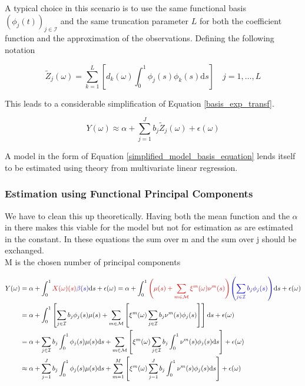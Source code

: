 \documentclass[11pt,twoside,a4paper]{article}
\begin{document}
	A typical choice in this scenario is to use the same functional basis $\left(\phi_j(t)\right)_{j \in \mathcal{I}}$ and the same truncation parameter $L$ for both the coefficient function and the approximation of the observations. Defining the following notation 

	\begin{equation}
			\tilde{Z}_j(\omega) = \sum_{k = 1}^{L} \left[d_k(\omega) \int_{0}^{1} \phi_j(s) \phi_k(s) \mathrm{d}s \right] \quad j = 1, \dots, L
	\end{equation}

	This leads to a considerable simplification of Equation \ref{basis_exp_transf}.
	
	\begin{equation}\label{simplified_model_basis_equation}
		Y(\omega) \approx \alpha + \sum_{j = 1}^{J} b_j \tilde{Z}_j(\omega) + \epsilon(\omega)
	\end{equation}

	A model in the form of Equation \ref{simplified_model_basis_equation} lends itself to be estimated using theory from multivariate linear regression.
	
	\subsubsection{Estimation using Functional Principal Components}

	{\color{red} We have to clean this up theoretically. Having both the mean function and the $\alpha$ in there makes this viable for the model but not for estimation as are estimated in the constant. In these equations the sum over m and the sum over j should be exchanged.\\
	M is the chosen number of principal components}

	\begin{equation}
		\begin{split}
			Y(\omega) &= \alpha + \int_{0}^{1} {\color{red}X(\omega)(s)} {\color{blue}\beta(s)} \mathrm{d}s + \epsilon(\omega)
			= \alpha + \int_{0}^{1} {\color{red}\left(\mu(s) + \sum_{m \in \mathcal{M}} \xi^m(\omega) \nu^m(s)\right)} {\color{blue}\left(\sum_{j \in \mathcal{I}} b_j \phi_j(s)\right)} \mathrm{d}s + \epsilon(\omega)\\
			&= \alpha + \int_{0}^{1} \left[ \sum_{j \in \mathcal{I}} b_j \phi_j(s) \mu(s) + \sum_{m \in \mathcal{M}} \left[ \xi^m(\omega) \sum_{j \in \mathcal{I}} b_j \nu^m(s) \phi_j(s) \right] \right] \mathrm{d}s + \epsilon(\omega) \\
			&= \alpha + \sum_{j \in \mathcal{I}} b_j \int_{0}^{1} \phi_j(s) \mu(s) \mathrm{d}s + \sum_{m \in \mathcal{M}} \left[ \xi^m(\omega) \sum_{j \in \mathcal{I}} b_j \int_{0}^{1}\nu^m(s) \phi_j(s) \mathrm{d}s \right] + \epsilon(\omega) \\
			& \approx \alpha + \sum_{j = 1}^{J} b_j \int_{0}^{1} \phi_j(s) \mu(s) \mathrm{d}s + \sum_{m  = 1}^{M}\left[ \xi^m(\omega) \sum_{j = 1}^{J} b_j \int_{0}^{1}\nu^m(s) \phi_j(s) \mathrm{d}s \right] + \epsilon(\omega)
		\end{split}
	\end{equation}
\end{document}
